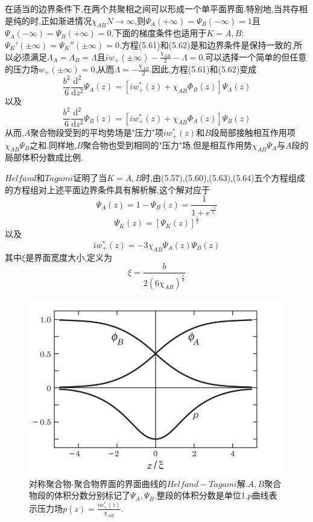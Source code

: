 在适当的边界条件下,在两个共聚相之间可以形成一个单平面界面.特别地,当共存相是纯的时,正如渐进情况$\chi_{AB}N\rightarrow\infty$,则$\Psi_{A}(+\infty)=\Psi_{B}(-\infty)=1$且$\Psi_{A}(-\infty)=\Psi_{B}(+\infty)=0$.下面的梯度条件也适用于$K=A,B$:$\Psi_K'(\pm\infty)=\Psi_K''(\pm\infty)=0$.方程(5.61)和(5.62)是和边界条件是保持一致的,所以必须满足$\Lambda_A=\Lambda_B=\Lambda$且$iw_+(\pm \infty)-\frac{\chi_{AB}}{2}-\Lambda=0$.可以选择一个简单的但任意的压力场$w_+(\pm\infty)=0$,从而$\Lambda=-\frac{\chi_{AB}}{2}$.因此,方程(5.61)和(5.62)变成
\begin{equation}
\frac{b^{2}}{6}\frac{\mathrm{d}^{2}}{\mathrm{d} z^{2}} \Psi_{A}(z)=[iw_+^*(z)+\chi_{AB}\Phi_{B}(z)]\Psi_{A}(z)
\end{equation}
以及
\begin{equation}
\frac{b^{2}}{6}\frac{\mathrm{d}^{2}}{\mathrm{d} z^{2}} \Psi_{B}(z)=[iw_+^*(z)+\chi_{AB}\Phi_{A}(z)]\Psi_{B}(z)
\end{equation}
从而,$A$聚合物段受到的平均势场是"压力"项$iw_+^*(z)$和$B$段局部接触相互作用项$\chi_{AB}\Psi_{B}$之和.同样地,$B$聚合物也受到相同的"压力"场,但是相互作用势$\chi_{AB}\Psi_{A}$与$A$段的局部体积分数成比例.

$Helfand$和$Tagami$证明了当$K=A,B$时,由(5.57),(5.60),(5.63),(5.64)五个方程组成的方程组对上述平面边界条件具有解析解,这个解对应于
\begin{equation}
\Psi_{A}(z)=1-\Psi_{B}(z)=\frac{1}{1+e^{\frac{-z}{\xi}}}
\end{equation}
\begin{equation}
\Psi_K(z) = [\Psi_K(z)]^{\frac{1}{2}}
\end{equation}
以及
\begin{equation}
iw_+^*(z)=-3\chi_{AB}\Psi_{A}(z)\Psi_{B}(z)
\end{equation}
其中$\xi$是界面宽度大小,定义为
\begin{equation}
\xi = \frac{b}{2(6\chi_{AB})^{\frac{1}{2}}}
\end{equation}
\begin{figure}[H]
	\centering
	\includegraphics[width=12cm]{./figures/fig5-4.png}
	\caption{对称聚合物-聚合物界面的界面曲线的$Helfand−Tagami$解.$A,B$聚合物段的体积分数分别标记了$\Psi_{A},\Psi_{B}$.整段的体积分数是单位1.$p$曲线表示压力场$p(z)=\frac{iw_+^*(z)}{\chi_{AB}}$.}
\end{figure}

